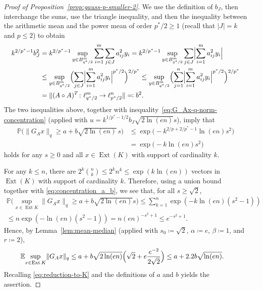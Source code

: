 \documentclass[a4paper]{amsart}
\theoremstyle{definition}
\theoremstyle{remark}
\numberwithin{equation}{section}
\newcommand*{\EE}{\mathbb{E}}
\newcommand*{\PP}{\mathbb{P}}
\newcommand*{\hadprod}{\mathbin{\circ}} %
\newcommand*{\Ext}{\operatorname{Ext}} %
\begin{document}
\begin{proof}[Proof of Proposition~\ref{prop:gauss-p-smaller-2}]
We use the definition of $b_J$,
then interchange the sums,
use the triangle inequality,
and then the inequality between the arithmetic mean and the power mean of order $p^*/2\geq 1$ (recall that $|J|=k$ and $p\leq 2$) to obtain
\begin{align} \label{eq:kbj}	\nonumber
	k^{2/p^*-1} b_J^2
	&= k^{2/p^*-1} \sup_{y\in B^m_{q^*/2}}  \sum_{i=1}^m \sum_{j\in J} a_{ij}^2 y_i
	= k^{2/p^*-1} \sup_{y\in B^m_{q^*/2}} \sum_{j\in J} \Bigl| \sum_{i=1}^m  a_{ij}^2 y_i \Bigr| \\ \nonumber
	&\leq \sup_{y\in B^m_{q^*/2}} \Bigl(  \sum_{j\in J} \Bigl| \sum_{i=1}^m a_{ij}^2 y_i \Bigr| ^{p^*/2}\Bigr)^{2/p^*}
	\leq \sup_{y\in B^m_{q^*/2}} \Bigl( \sum_{j=1}^n\Bigl| \sum_{i=1}^m  a_{ij}^2 y_i \Bigr| ^{p^*/2}\Bigr)^{2/p^*}	\\
	& =  \|(A\hadprod A)^T \colon \ell^m_{q^*/2} \to \ell^n_{p^*/2}\| \eqqcolon b^2.
\end{align}
The two inequalities above, together with inequality~\eqref{eq:G_Ax-q-norm-concentration}
(applied with $u=k^{1/p^* -1/2} b_J \sqrt{2\ln(en)} s$), imply that
\begin{align}
\label{eq:concentration_a_b}
  \PP\bigl(\|G_A x\|_q \geq a + b \sqrt{2\ln(en)}\, s \bigr)
 & \leq \exp\bigl( - k^{2/p+2/p^*-1} \ln(en)s^2\bigr) \\
&= \exp\bigl( - k \ln(en)s^2\bigr)\nonumber
\end{align}
holds for any $s\geq 0$ and all $x\in \Ext(K)$ with support of cardinality $k$.

For any $k\leq n$,
 there are $2^k \binom{n}{k} \leq 2^k n^k \leq \exp( k \ln(en))$ vectors in $\Ext(K)$
 with support of cardinality $k$.
Therefore, using a union bound together with \eqref{eq:concentration_a_b}, we see that, for all $s\geq \sqrt{2}$,
\begin{multline*}
\PP\bigl(\sup_{x\in \Ext K}\! \|G_A x\|_q \geq a + b \sqrt{2\ln(en)} s \bigr)
 \leq \sum_{k=1}^n \exp( -k \ln(en)(s^2-1))\\
  \leq n \exp( - \ln(en)(s^2-1))
 = n(en)^{-s^2+1}\leq e^{-s^2+1}.
\end{multline*}
Hence, by Lemma~\ref{lem:mean-median} (applied with $s_0\coloneqq\sqrt{2}$, $\alpha\coloneqq e$, $\beta\coloneqq 1$, and $r\coloneqq 2$),
\begin{align*}
\EE\! \sup_{x\in \Ext K}\! \|G_A x\|_q & \leq a + b \sqrt{2\ln(en)} \Bigl(\sqrt{2} + e \frac{e^{-2}}{2\sqrt{2}}\Bigr) \leq a + 2.2 b \sqrt{\ln(en)}.
\end{align*}
Recalling \eqref{eq:reduction-to-K} and the definitions of $a$ and $b$ yields the assertion.
\end{proof}
\end{document}
